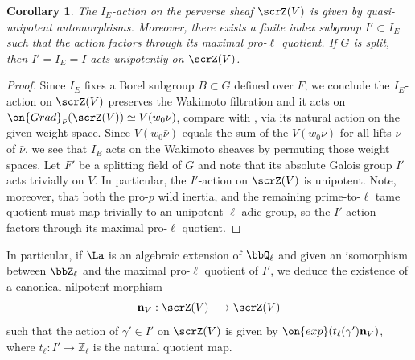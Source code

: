 \documentclass[10pt, reqno]{amsart}
\theoremstyle{plain}
\newtheorem{corollary}[theorem]{Corollary}
\theoremstyle{definition}
\numberwithin{equation}{section}
\begin{document}
	\begin{corollary} \label{unipotent_new}
		The $I_E$-action on the perverse sheaf $\scrZ(V)$ is given by quasi-unipotent automorphisms. Moreover, there exists a finite index subgroup $I'\subset I_E$ such that the action factors through its maximal pro-$\ell$ quotient. If $G$ is split, then $I'=I_E=I$ acts unipotently on $\scrZ(V)$.
	\end{corollary}
	
	\begin{proof}
		Since $I_E$ fixes a Borel subgroup $B \subset G$ defined over $F$, we conclude the $I_E$-action on $\scrZ(V)$ preserves the Wakimoto filtration and it acts on $\on{Grad}_{\bar \nu}(\scrZ(V))\simeq V(w_0\bar \nu)$, compare with , via its natural action on the given weight space. Since $V(w_0\bar \nu)$ equals the sum of the $V(w_0 \nu)$ for all lifts $\nu$ of $\bar \nu$, we see that $I_E$ acts on the Wakimoto sheaves by permuting those weight spaces. Let $F'$ be a splitting field of $G$ and note that its absolute Galois group $I'$ acts trivially on $V$. In particular, the $I'$-action on $\scrZ(V)$ is unipotent. Note, moreover, that both the pro-$p$ wild inertia, and the remaining prime-to-$\ell$ tame quotient must map trivially to an unipotent $\ell$-adic group, so the $I'$-action factors through its maximal pro-$\ell$ quotient.
	\end{proof}
	
	
	In particular, if $\La$ is an algebraic extension of $\bbQ_\ell$ and given an isomorphism between $\bbZ_\ell$ and the maximal pro-$\ell$ quotient of $I'$, we deduce the existence of a canonical nilpotent morphism
	\begin{equation}
		\mathbf{n}_V: \scrZ(V) \longrightarrow \scrZ(V)
	\end{equation}
	such that the action of $\gamma' \in I'$ on $\scrZ(V)$ 
	is given by $\on{exp}(t_\ell(\gamma') \mathbf{n}_V)$,
	where $t_\ell: I' \rightarrow \mathbb{Z}_\ell$ is the natural quotient map.
	
	
	
\end{document}
